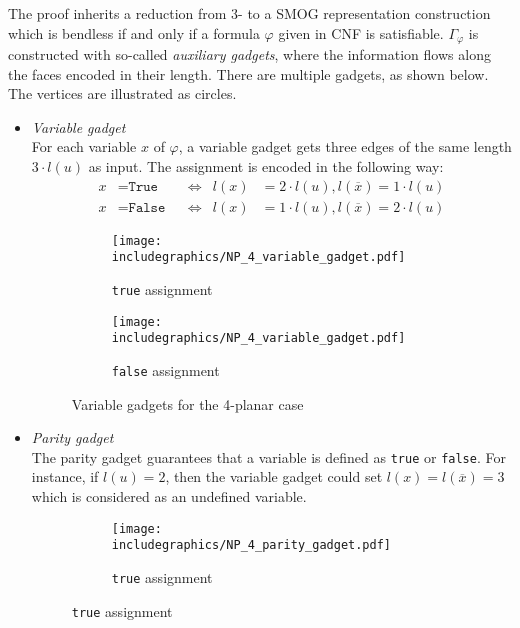 \begin{sketch}
	The proof inherits a reduction from 3- to a SMOG representation construction which is bendless if and only if a formula $\varphi$ given in CNF is satisfiable. $\Gamma_\varphi$ is constructed with so-called \textit{auxiliary gadgets}, where the information flows along the faces encoded in their length. There are multiple gadgets, as shown below. The vertices are illustrated as circles.
	\begin{itemize}
		\item \textit{Variable gadget}\\
		For each variable $x$ of $\varphi$, a variable gadget gets three edges of the same length $3\cdot l(u)$ as input. The assignment is encoded in the following way:
		\begin{align}
		x &= \texttt{True}  & &\Leftrightarrow  & l(x) &= 2\cdot l(u), l(\overline{x}) = 1\cdot l(u)\\
		x &= \texttt{False} & &\Leftrightarrow & l(x) &= 1\cdot l(u), l(\overline{x}) = 2\cdot l(u)
		\end{align}
		\begin{figure}[H]
			\centering
			\begin{subfigure}{0.4\textwidth}
				\centering
				\texttt{[image: includegraphics/NP\_4\_variable\_gadget.pdf]}
				\caption{\texttt{true} assignment}
			\end{subfigure}
			\begin{subfigure}{0.4\textwidth}
				\centering
				\texttt{[image: includegraphics/NP\_4\_variable\_gadget.pdf]}
				\caption{\texttt{false} assignment}
			\end{subfigure}
			\caption{Variable gadgets for the 4-planar case}\label{im:4-variable-gadgets}
		\end{figure}
		\item \textit{Parity gadget}\\
		The parity gadget guarantees that a variable is defined as \texttt{true} or \texttt{false}. For instance, if $l(u) = 2$, then the variable gadget could set $l(x) = l(\overline{x}) = 3$ which is considered as an undefined variable.
		\begin{figure}[H]
			\centering
			\begin{subfigure}{0.4\textwidth}
				\centering
				\texttt{[image: includegraphics/NP\_4\_parity\_gadget.pdf]}
				\caption{\texttt{true} assignment}
			\end{subfigure}

\end{figure}
\end{itemize}
\end{sketch}

